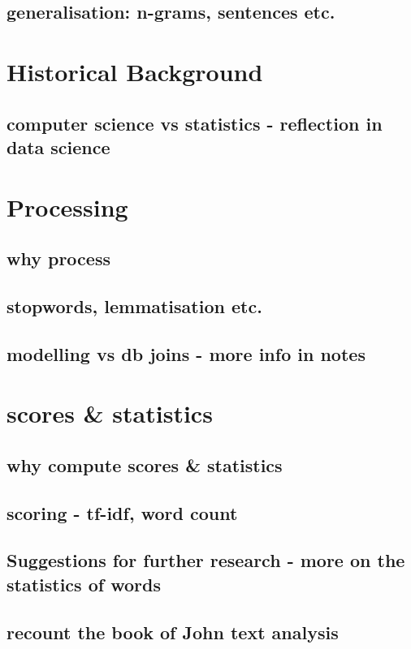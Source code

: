 \documentclass[11pt, a4paper, oneside]{report}
\begin{document}
\subsection{generalisation: n-grams, sentences etc.}

\section{Historical Background}
\label{sec:hist-backgr}

\subsection{computer science vs statistics - reflection in data science}

\section{Processing}
\label{sec:processing}

\subsection{why process}
\subsection{stopwords, lemmatisation etc.}
\subsection{modelling vs db joins - more info in notes}

\section{scores \& statistics}
\label{sec:statistics}

\subsection{why compute scores \& statistics}
\subsection{scoring - tf-idf, word count}
\subsection{Suggestions for further research - more on the statistics of words}
\subsection{recount the book of John text analysis}
\end{document}
